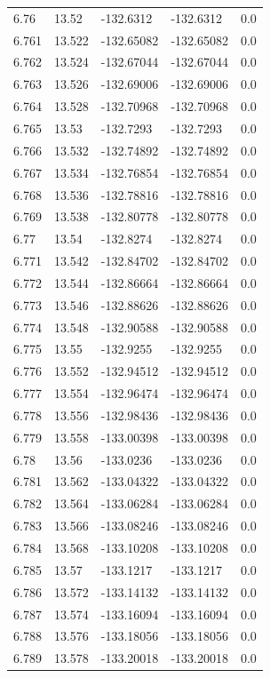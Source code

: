 \begin{tabular}{lllll}
6.76 & 13.52 & -132.6312 & -132.6312 & 0.0 \\
6.761 & 13.522 & -132.65082 & -132.65082 & 0.0 \\
6.762 & 13.524 & -132.67044 & -132.67044 & 0.0 \\
6.763 & 13.526 & -132.69006 & -132.69006 & 0.0 \\
6.764 & 13.528 & -132.70968 & -132.70968 & 0.0 \\
6.765 & 13.53 & -132.7293 & -132.7293 & 0.0 \\
6.766 & 13.532 & -132.74892 & -132.74892 & 0.0 \\
6.767 & 13.534 & -132.76854 & -132.76854 & 0.0 \\
6.768 & 13.536 & -132.78816 & -132.78816 & 0.0 \\
6.769 & 13.538 & -132.80778 & -132.80778 & 0.0 \\
6.77 & 13.54 & -132.8274 & -132.8274 & 0.0 \\
6.771 & 13.542 & -132.84702 & -132.84702 & 0.0 \\
6.772 & 13.544 & -132.86664 & -132.86664 & 0.0 \\
6.773 & 13.546 & -132.88626 & -132.88626 & 0.0 \\
6.774 & 13.548 & -132.90588 & -132.90588 & 0.0 \\
6.775 & 13.55 & -132.9255 & -132.9255 & 0.0 \\
6.776 & 13.552 & -132.94512 & -132.94512 & 0.0 \\
6.777 & 13.554 & -132.96474 & -132.96474 & 0.0 \\
6.778 & 13.556 & -132.98436 & -132.98436 & 0.0 \\
6.779 & 13.558 & -133.00398 & -133.00398 & 0.0 \\
6.78 & 13.56 & -133.0236 & -133.0236 & 0.0 \\
6.781 & 13.562 & -133.04322 & -133.04322 & 0.0 \\
6.782 & 13.564 & -133.06284 & -133.06284 & 0.0 \\
6.783 & 13.566 & -133.08246 & -133.08246 & 0.0 \\
6.784 & 13.568 & -133.10208 & -133.10208 & 0.0 \\
6.785 & 13.57 & -133.1217 & -133.1217 & 0.0 \\
6.786 & 13.572 & -133.14132 & -133.14132 & 0.0 \\
6.787 & 13.574 & -133.16094 & -133.16094 & 0.0 \\
6.788 & 13.576 & -133.18056 & -133.18056 & 0.0 \\
6.789 & 13.578 & -133.20018 & -133.20018 & 0.0 \\

\end{tabular}
